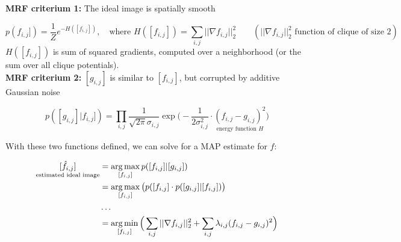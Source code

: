 \textbf{MRF criterium 1:} The ideal image is spatially smooth

\begin{equation*}
	p(f_{i,j}]) = \frac{1}{Z} e^{-H([f_{i,j}])}, \quad \text{where } H([f_{i,j}]) = \sum_{i,j} ||\nabla f_{i,j}||_2^2 \qquad (||\nabla f_{i,j}||_2^2 \text{ function of clique of size 2})
\end{equation*}
$ H([f_{i,j}]) $ is sum of squared gradients, computed over a neighborhood (or the sum over all clique potentials).\\

\textbf{MRF criterium 2:} $[g_{i,j}]$ is similar to $[f_{i,j}]$, but corrupted by additive Gaussian noise

\begin{equation*}
	p([g_{i,j}] | f_{i,j}]) = \prod_{i,j} \frac{1}{\sqrt{2 \pi} \sigma_{i,j}} \exp\Big(- \frac{1}{2 \sigma_{i,j}^2} \cdot \underset{\text{energy function $H$}}{(f_{i,j} - g_{i,j})^2}\Big)
\end{equation*}

With these two functions defined, we can solve for a MAP estimate for $f$:

\begin{align*}
	\underset{\text{estimated ideal image}}{[\hat{f}_{i,j}]} &= \operatorname*{arg\,max}_{[f_{i,j}]} p([f_{i,j}] | [g_{i,j}])\\
					&= \operatorname*{arg\,max}_{[f_{i,j}]} \big(p([f_{i,j}] \cdot p([g_{i,j}] | [f_{i,j}])\big)\\
					& \dots\\
					&= \operatorname*{arg\,min}_{[f_{i,j}]} \Big(\sum_{i,j} ||\nabla f_{i,j}||_2^2 + \sum_{i,j} \lambda_{i,j} (f_{i,j} - g_{i,j})^2\Big)
\end{align*}

